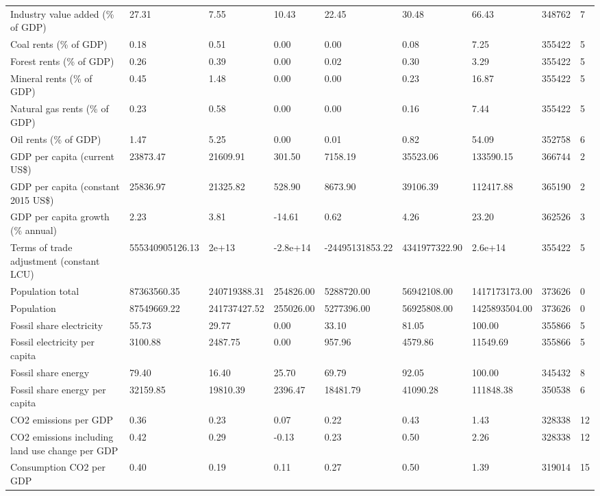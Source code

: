 \begin{longtable}{lllllllll}
Industry value added (\% of GDP) & 27.31 & 7.55 & 10.43 & 22.45 & 30.48 & 66.43 & 348762 & 7\\
Coal rents (\% of GDP) & 0.18 & 0.51 & 0.00 & 0.00 & 0.08 & 7.25 & 355422 & 5\\
Forest rents (\% of GDP) & 0.26 & 0.39 & 0.00 & 0.02 & 0.30 & 3.29 & 355422 & 5\\
\addlinespace
Mineral rents (\% of GDP) & 0.45 & 1.48 & 0.00 & 0.00 & 0.23 & 16.87 & 355422 & 5\\
Natural gas rents (\% of GDP) & 0.23 & 0.58 & 0.00 & 0.00 & 0.16 & 7.44 & 355422 & 5\\
Oil rents (\% of GDP) & 1.47 & 5.25 & 0.00 & 0.01 & 0.82 & 54.09 & 352758 & 6\\
GDP per capita (current US\$) & 23873.47 & 21609.91 & 301.50 & 7158.19 & 35523.06 & 133590.15 & 366744 & 2\\
GDP per capita (constant 2015 US\$) & 25836.97 & 21325.82 & 528.90 & 8673.90 & 39106.39 & 112417.88 & 365190 & 2\\
\addlinespace
GDP per capita growth (\% annual) & 2.23 & 3.81 & -14.61 & 0.62 & 4.26 & 23.20 & 362526 & 3\\
Terms of trade adjustment (constant LCU) & 555340905126.13 & 2e+13 & -2.8e+14 & -24495131853.22 & 4341977322.90 & 2.6e+14 & 355422 & 5\\
Population total & 87363560.35 & 240719388.31 & 254826.00 & 5288720.00 & 56942108.00 & 1417173173.00 & 373626 & 0\\
Population & 87549669.22 & 241737427.52 & 255026.00 & 5277396.00 & 56925808.00 & 1425893504.00 & 373626 & 0\\
Fossil share electricity & 55.73 & 29.77 & 0.00 & 33.10 & 81.05 & 100.00 & 355866 & 5\\
\addlinespace
Fossil electricity per capita & 3100.88 & 2487.75 & 0.00 & 957.96 & 4579.86 & 11549.69 & 355866 & 5\\
Fossil share energy & 79.40 & 16.40 & 25.70 & 69.79 & 92.05 & 100.00 & 345432 & 8\\
Fossil share energy per capita & 32159.85 & 19810.39 & 2396.47 & 18481.79 & 41090.28 & 111848.38 & 350538 & 6\\
CO2 emissions per GDP & 0.36 & 0.23 & 0.07 & 0.22 & 0.43 & 1.43 & 328338 & 12\\
CO2 emissions including land use change per GDP & 0.42 & 0.29 & -0.13 & 0.23 & 0.50 & 2.26 & 328338 & 12\\
\addlinespace
Consumption CO2 per GDP & 0.40 & 0.19 & 0.11 & 0.27 & 0.50 & 1.39 & 319014 & 15\\

\end{longtable}
